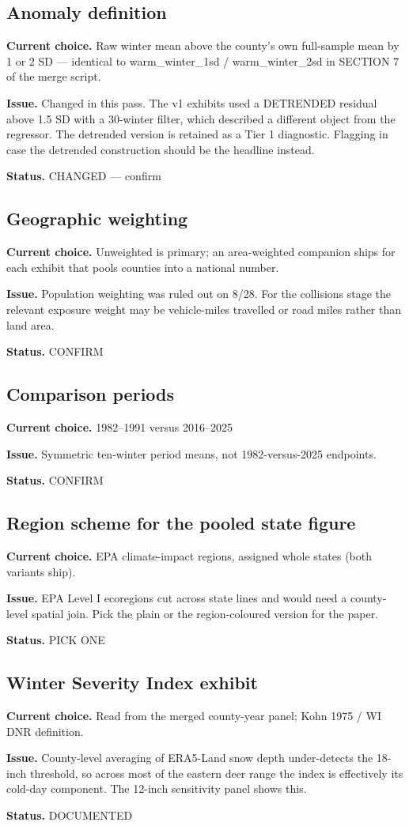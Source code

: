 \documentclass[11pt, english, letterpaper]{article}
\begin{document}
\subsection*{Anomaly definition}
\textbf{Current choice.} Raw winter mean above the county's own full-sample mean by 1 or 2 SD — identical to warm\_winter\_1sd / warm\_winter\_2sd in SECTION 7 of the merge script.\par
\textbf{Issue.} Changed in this pass. The v1 exhibits used a DETRENDED residual above 1.5 SD with a 30-winter filter, which described a different object from the regressor. The detrended version is retained as a Tier 1 diagnostic. Flagging in case the detrended construction should be the headline instead.\par
\textbf{Status.} CHANGED — confirm
\subsection*{Geographic weighting}
\textbf{Current choice.} Unweighted is primary; an area-weighted companion ships for each exhibit that pools counties into a national number.\par
\textbf{Issue.} Population weighting was ruled out on 8/28. For the collisions stage the relevant exposure weight may be vehicle-miles travelled or road miles rather than land area.\par
\textbf{Status.} CONFIRM
\subsection*{Comparison periods}
\textbf{Current choice.} 1982–1991 versus 2016–2025\par
\textbf{Issue.} Symmetric ten-winter period means, not 1982-versus-2025 endpoints.\par
\textbf{Status.} CONFIRM
\subsection*{Region scheme for the pooled state figure}
\textbf{Current choice.} EPA climate-impact regions, assigned whole states (both variants ship).\par
\textbf{Issue.} EPA Level I ecoregions cut across state lines and would need a county-level spatial join. Pick the plain or the region-coloured version for the paper.\par
\textbf{Status.} PICK ONE
\subsection*{Winter Severity Index exhibit}
\textbf{Current choice.} Read from the merged county-year panel; Kohn 1975 / WI DNR definition.\par
\textbf{Issue.} County-level averaging of ERA5-Land snow depth under-detects the 18-inch threshold, so across most of the eastern deer range the index is effectively its cold-day component. The 12-inch sensitivity panel shows this.\par
\textbf{Status.} DOCUMENTED
\end{document}
